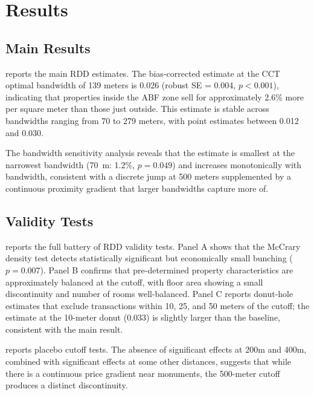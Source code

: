\documentclass[12pt]{article}
\begin{document}
\section{Results}

\subsection{Main Results}

 reports the main RDD estimates. The bias-corrected estimate at the CCT optimal bandwidth of 139 meters is 0.026 (robust SE = 0.004, $p < 0.001$), indicating that properties inside the ABF zone sell for approximately 2.6\% more per square meter than those just outside. This estimate is stable across bandwidths ranging from 70 to 279 meters, with point estimates between 0.012 and 0.030.



The bandwidth sensitivity analysis reveals that the estimate is smallest at the narrowest bandwidth (70~m: 1.2\%, $p = 0.049$) and increases monotonically with bandwidth, consistent with a discrete jump at 500 meters supplemented by a continuous proximity gradient that larger bandwidths capture more of.

\subsection{Validity Tests}

 reports the full battery of RDD validity tests. Panel A shows that the McCrary density test detects statistically significant but economically small bunching ($p = 0.007$). Panel B confirms that pre-determined property characteristics are approximately balanced at the cutoff, with floor area showing a small discontinuity and number of rooms well-balanced. Panel C reports donut-hole estimates that exclude transactions within 10, 25, and 50 meters of the cutoff; the estimate at the 10-meter donut (0.033) is slightly larger than the baseline, consistent with the main result.




 reports placebo cutoff tests. The absence of significant effects at 200m and 400m, combined with significant effects at some other distances, suggests that while there is a continuous price gradient near monuments, the 500-meter cutoff produces a distinct discontinuity.
\end{document}
